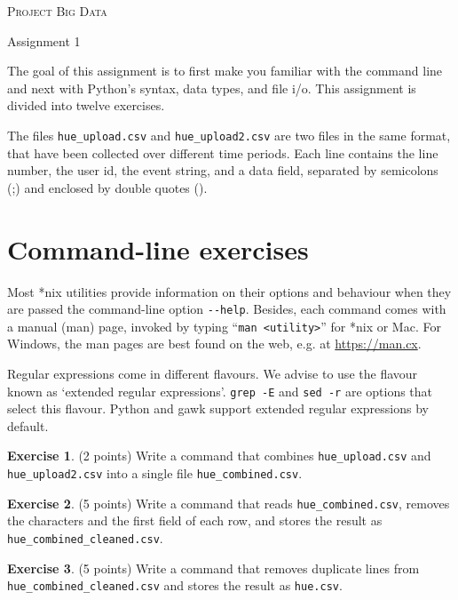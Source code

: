 \documentclass[a4paper]{report}
\theoremstyle{definition}
\newtheorem{exercise}{Exercise}
\newcommand{\blankline}{\par\vspace{5mm}}
\begin{document}
	
\begin{center}
	\textsc{\Large Project Big Data}
	\blankline
	
	{\large Assignment 1}
\end{center}

\blankline \noindent The goal of this assignment is to first make you familiar with the command line and next with Python’s syntax, data types, and file i/o. This assignment is divided into twelve exercises.

The files \texttt{hue\_upload.csv} and \texttt{hue\_upload2.csv} are two files in the same format, that have been collected over different time periods. Each line contains the line number, the user id, the event string, and a data field, separated by semicolons (;) and enclosed by double quotes (\textquotedbl{}).

\section*{Command-line exercises}
\label{command-line-exercises}

Most *nix utilities provide information on their options and behaviour when
they are passed the command-line option \texttt{-{}-help}. Besides, each
command comes with a manual (man) page, invoked by typing ``\texttt{man
<utility>}'' for
*nix or Mac. For Windows, the man pages are best found on the web, e.g.
at \url{https://man.cx}.

Regular expressions come in different flavours. We advise to use the flavour
known as `extended regular expressions'. \texttt{grep -E} and \texttt{sed -r}
are options that select this flavour. Python and gawk support extended regular
expressions by default.

\begin{exercise}
	(2 points) Write a command that combines \texttt{hue\_upload.csv} and \texttt{hue\_upload2.csv} into a single file \texttt{hue\_combined.csv}.
\end{exercise}

\begin{exercise}
	(5 points) Write a command that reads \texttt{hue\_combined.csv}, removes the \textquotedbl{} characters and the first field of each row, and stores the result as \texttt{hue\_combined\_cleaned.csv}.
\end{exercise}

\begin{exercise}
	(5 points) Write a command that removes duplicate lines from \texttt{hue\_combined\_cleaned.csv} and stores the result as \texttt{hue.csv}.
\end{exercise}
\end{document}
